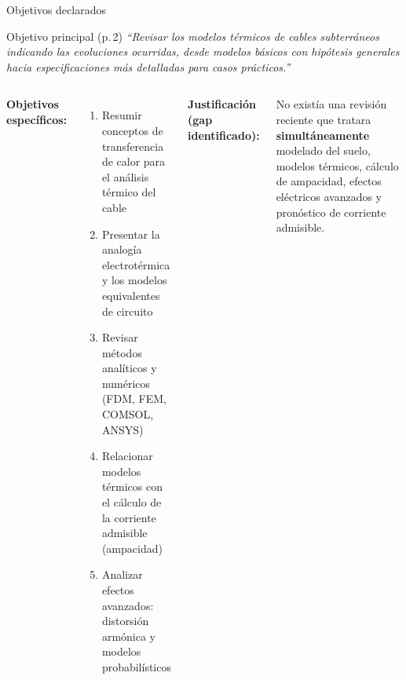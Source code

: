 \documentclass[aspectratio=169]{beamer}
\begin{document}
\begin{frame}{Objetivos declarados}
  \begin{block}{Objetivo principal (p.\,2)}
    \small
    \textit{``Revisar los modelos térmicos de cables subterráneos
    indicando las evoluciones ocurridas, desde modelos básicos con hipótesis
    generales hacia especificaciones más detalladas para casos prácticos.''}
  \end{block}
  \vspace{0.4em}
  \begin{columns}[T]
      \textbf{Objetivos específicos:}
      \begin{enumerate}\small
        \item Resumir conceptos de transferencia de calor para el análisis
              térmico del cable
        \item Presentar la analogía electrotérmica y los modelos equivalentes
              de circuito
        \item Revisar métodos analíticos y numéricos (FDM, FEM, COMSOL, ANSYS)
        \item Relacionar modelos térmicos con el cálculo de la corriente
              admisible (ampacidad)
        \item Analizar efectos avanzados: distorsión armónica y modelos
              probabilísticos
      \end{enumerate}
      \textbf{Justificación (gap identificado):}
      \begin{alertblock}{}
        \small
        No existía una revisión reciente que tratara \textbf{simultáneamente}
        modelado del suelo, modelos térmicos, cálculo de ampacidad,
        efectos eléctricos avanzados y pronóstico de corriente admisible.
      \end{alertblock}
  \end{columns}
\end{frame}
\end{document}
